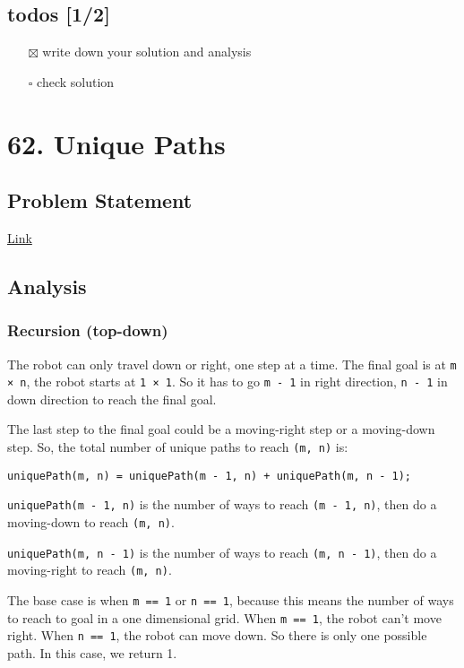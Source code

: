 \documentclass[11pt]{article}
\begin{document}
\subsection{todos [1/2]}
\label{sec:orgd14ad9c}
\begin{itemize}
\item[{$\boxtimes$}] write down your solution and analysis
\item[{$\square$}] check solution
\end{itemize}
\section{62. Unique Paths}
\label{sec:org0e20784}
\subsection{Problem Statement}
\label{sec:org3f42bd5}
\href{https://leetcode.com/problems/unique-paths/}{Link}
\subsection{Analysis}
\label{sec:org8e7d12c}
\subsubsection{Recursion (top-down)}
\label{sec:org0111d62}
The robot can only travel down or right, one step at a time. The final goal is at \texttt{m × n}, the robot starts at \texttt{1 × 1}. So it has to go \texttt{m - 1} in right direction, \texttt{n - 1} in down direction to reach the final goal.

The last step to the final goal could be a moving-right step or a moving-down step. So, the total number of unique paths to reach \texttt{(m, n)} is:
\begin{verbatim}
uniquePath(m, n) = uniquePath(m - 1, n) + uniquePath(m, n - 1);
\end{verbatim}

\texttt{uniquePath(m - 1, n)} is the number of ways to reach \texttt{(m - 1, n)}, then do a moving-down to reach \texttt{(m, n)}.

\texttt{uniquePath(m, n - 1)} is the number of ways to reach \texttt{(m, n - 1)}, then do a moving-right to reach \texttt{(m, n)}.

The base case is when \texttt{m == 1} or \texttt{n == 1}, because this means the number of ways to reach to goal in a one dimensional grid. When \texttt{m == 1}, the robot can't move right. When \texttt{n == 1}, the robot can move down. So there is only one possible path. In this case, we return 1.
\end{document}
